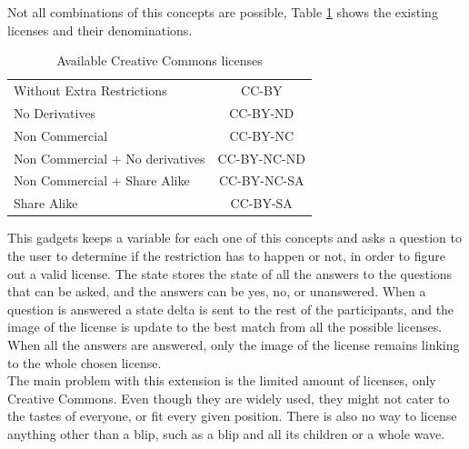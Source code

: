 Not all combinations of this concepts are possible, Table \ref{fig:cc_licenses} shows the existing licenses and their denominations.
\begin{table}[H]
  \begin{center}
    \begin{tabular}{ | l | c |}
      \hline
      Without Extra Restrictions & CC-BY\\
      No Derivatives & CC-BY-ND\\
      Non Commercial & CC-BY-NC\\
      Non Commercial + No derivatives & CC-BY-NC-ND\\
      Non Commercial + Share Alike & CC-BY-NC-SA\\
      Share Alike & CC-BY-SA\\
      \hline
    \end{tabular}
  \end{center}
  \caption{Available Creative Commons licenses}
  \label{fig:cc_licenses}
\end{table}
This gadgets keeps a variable for each one of this concepts and asks a question to the user to determine if the restriction has to happen or not, in order to figure out a valid license. The state stores the state of all the answers to the questions that can be asked, and the answers can be yes, no, or unanswered. When a question is answered a state delta is sent to the rest of the participants, and the image of the license is update to the best match from all the possible licenses. When all the answers are answered, only the image of the license remains linking to the whole chosen license.\\[.2cm]
The main problem with this extension is the limited amount of licenses, only Creative Commons. Even though they are widely used, they might not cater to the tastes of everyone, or fit every given position. There is also no way to license anything other than a blip, such as a blip and all its children or a whole wave.
